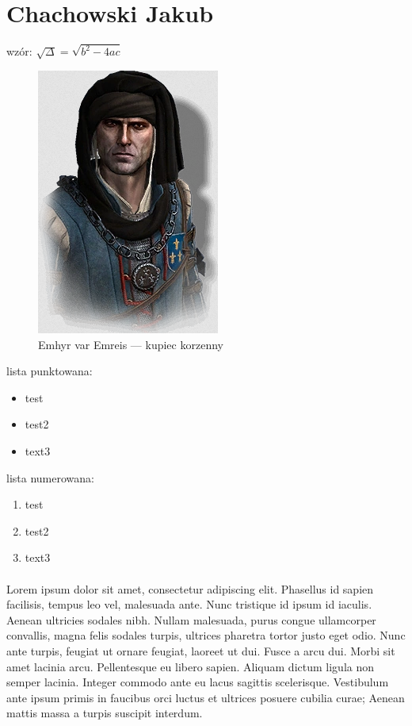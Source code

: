 \newpage
\section{Chachowski Jakub}
\raggedright
wzór: $\sqrt{\Delta} = \sqrt{b^2-4ac}$


\begin{figure}[htbp!]
\begin{center}
    \includegraphics{pictures/kupiec.png}
    \caption{Emhyr var Emreis — kupiec korzenny}
    \label{fig:emhyr}
\end{center}
\end{figure}


\begin{figure}[htbp!]
    
\end{figure}

lista punktowana:
\begin{itemize}
    \item test
    \item test2
    \item text3
\end{itemize}

lista numerowana:
\begin{enumerate}
    \item test
    \item test2
    \item text3
\end{enumerate}


\paragraph{}
Lorem ipsum dolor sit amet, consectetur adipiscing elit. Phasellus id sapien facilisis, tempus leo vel, malesuada ante. Nunc tristique id ipsum id iaculis. Aenean ultricies sodales nibh. Nullam malesuada, purus congue ullamcorper convallis, magna felis sodales turpis, ultrices pharetra tortor justo eget odio. Nunc ante turpis, feugiat ut ornare feugiat, laoreet ut dui. Fusce a arcu dui. Morbi sit amet lacinia arcu. Pellentesque eu libero sapien. Aliquam dictum ligula non semper lacinia. Integer commodo ante eu lacus sagittis scelerisque. Vestibulum ante ipsum primis in faucibus orci luctus et ultrices posuere cubilia curae; Aenean mattis massa a turpis suscipit interdum.
